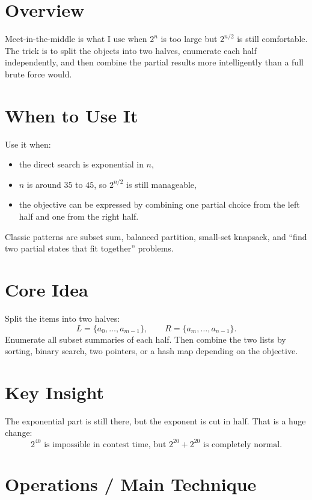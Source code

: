 \section*{Overview}

Meet-in-the-middle is what I use when \(2^n\) is too large but \(2^{n/2}\) is still comfortable. The trick is to split
the objects into two halves, enumerate each half independently, and then combine the partial results more intelligently
than a full brute force would.

\section*{When to Use It}

Use it when:

\begin{itemize}
  \item the direct search is exponential in \(n\),
  \item \(n\) is around \(35\) to \(45\), so \(2^{n/2}\) is still manageable,
  \item the objective can be expressed by combining one partial choice from the left half and one from the right half.
\end{itemize}

Classic patterns are subset sum, balanced partition, small-set knapsack, and ``find two partial states that fit
together'' problems.

\section*{Core Idea}

Split the items into two halves:
\[
L = \{a_0, \dots, a_{m-1}\},
\qquad
R = \{a_m, \dots, a_{n-1}\}.
\]
Enumerate all subset summaries of each half. Then combine the two lists by sorting, binary search, two pointers, or a
hash map depending on the objective.

\section*{Key Insight}

The exponential part is still there, but the exponent is cut in half. That is a huge change:
\[
2^{40} \text{ is impossible in contest time, but } 2^{20} + 2^{20} \text{ is completely normal.}
\]

\section*{Operations / Main Technique}

